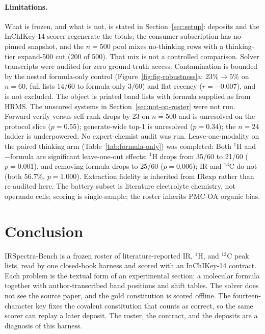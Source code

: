 \documentclass{article}
\begin{document}
\paragraph{Limitations.}
\label{sec:limitations}
What is frozen, and what is not, is stated in Section~\ref{sec:setup}:
deposits and the InChIKey-14 scorer regenerate the totals; the consumer
subscription has no pinned snapshot, and the $n{=}500$ pool mixes
no-thinking rows with a thinking-tier expand-500 cut (200 of 500).
That mix is not a controlled comparison.
Solver transcripts were audited for zero ground-truth access.
Contamination is bounded by the nested formula-only control
(Figure~\ref{fig:fig-robustness}a; $23\%\to5\%$ on $n{=}60$,
full lists $14/60$ to formula-only $3/60$)
and flat recency ($r{=}{-}0.007$), and is not excluded.
The object is printed band lists with formula supplied as from HRMS.
The unscored systems in Section~\ref{sec:not-on-roster} were not run.
Forward-verify versus self-rank drops by 23 on $n{=}500$ and is unresolved
on the protocol slice ($p{=}0.55$); generate-wide top-1 is unresolved
($p{=}0.34$); the $n{=}24$ ladder is underpowered.
No expert-chemist audit was run.
Leave-one-modality on the paired thinking arm (Table~\ref{tab:formula-only}) was completed:
Both $^1$H and $-$formula are significant leave-one-out effects: $^1$H drops from 35/60 to 21/60 ($p{=}0.001$), and removing formula drops to 25/60 ($p{=}0.006$); IR and $^{13}$C do not (both $56.7$\%, $p{=}1.000$).
Extraction fidelity is inherited from IRexp rather than re-audited here.
The battery subset is literature electrolyte chemistry, not operando cells;
scoring is single-sample; the roster inherits PMC-OA organic bias.

\section{Conclusion}
\label{sec:conclusion}

IRSpectra-Bench is a frozen roster of literature-reported IR, $^1$H, and
$^{13}$C peak lists, read by one closed-book harness and scored with an
InChIKey-14 contract.
Each problem is the textual form of an experimental section: a molecular
formula together with author-transcribed band positions and shift tables.
The solver does not see the source paper, and the gold constitution is
scored offline.
The fourteen-character key fixes the covalent constitution that counts as
correct, so the same scorer can replay a later deposit.
The roster, the contract, and the deposits are a diagnosis of this
harness.
\end{document}
